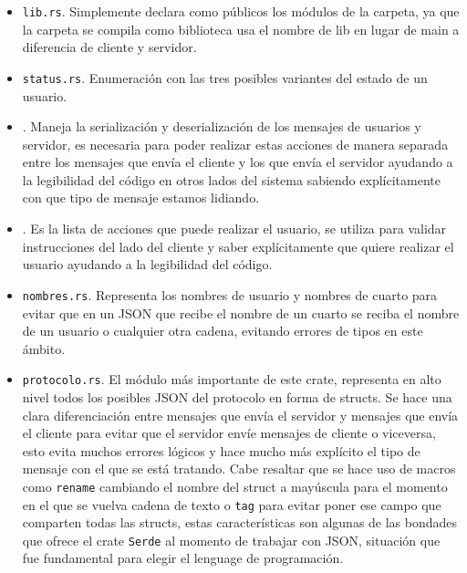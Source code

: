 \documentclass[12pt]{article}
\begin{document}
\begin{itemize}

\item \texttt{lib.rs}. Simplemente declara como públicos los módulos de la carpeta, ya que la carpeta se compila como biblioteca usa el nombre de lib en lugar de main a diferencia de cliente y servidor.

\item \texttt{status.rs}. Enumeración con las tres posibles variantes del estado de un usuario.

\item \texttt{}. Maneja la serialización y deserialización de los mensajes de usuarios y servidor, es necesaria para poder realizar estas acciones de manera separada entre los mensajes que envía el cliente y los que envía el servidor ayudando a la legibilidad del código en otros lados del sistema sabiendo explícitamente con que tipo de mensaje estamos lidiando.

\item \texttt{}. Es la lista de acciones que puede realizar el usuario, se utiliza para validar instrucciones del lado del cliente y saber explícitamente que quiere realizar el usuario ayudando a la legibilidad del código.

\item \texttt{nombres.rs}. Representa los nombres de usuario y nombres de cuarto para evitar que en un JSON que recibe el nombre de un cuarto se reciba el nombre de un usuario o cualquier otra cadena, evitando errores de tipos en este ámbito.

\item \texttt{protocolo.rs}. El módulo más importante de este crate, representa en alto nivel todos los posibles JSON del protocolo en forma de structs. Se hace una clara diferenciación entre mensajes que envía el servidor y mensajes que envía el cliente para evitar que el servidor envíe mensajes de cliente o viceversa, esto evita muchos errores lógicos y hace mucho más explícito el tipo de mensaje con el que se está tratando. Cabe resaltar que se hace uso de macros como \texttt{rename} cambiando el nombre del struct a mayúscula para el momento en el que se vuelva cadena de texto o \texttt{tag} para evitar poner ese campo que comparten todas las structs, estas características son algunas de las bondades que ofrece el crate \texttt{Serde} al momento de trabajar con JSON, situación que fue fundamental para elegir el lenguage de programación.

\end{itemize}
\end{document}
